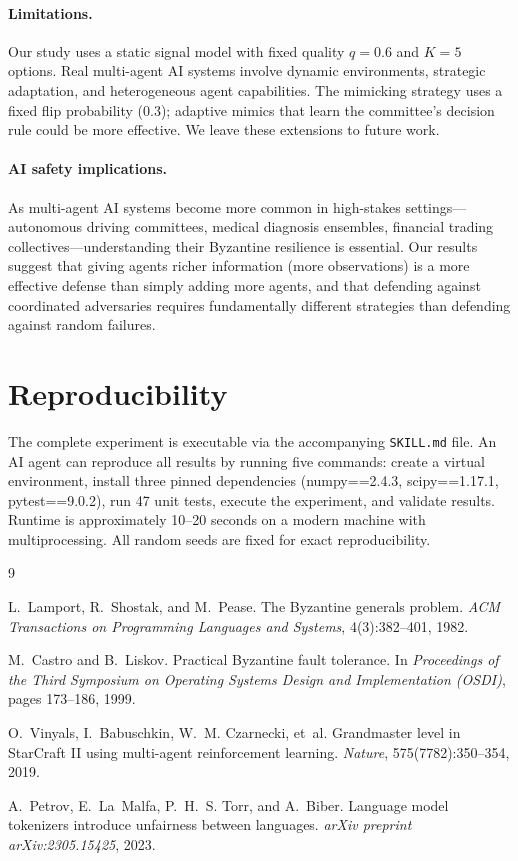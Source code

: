 \documentclass[11pt]{article}
\begin{document}
\paragraph{Limitations.}
Our study uses a static signal model with fixed quality $q = 0.6$ and $K = 5$ options.
Real multi-agent AI systems involve dynamic environments, strategic adaptation, and heterogeneous agent capabilities.
The mimicking strategy uses a fixed flip probability (0.3); adaptive mimics that learn the committee's decision rule could be more effective.
We leave these extensions to future work.

\paragraph{AI safety implications.}
As multi-agent AI systems become more common in high-stakes settings---autonomous driving committees, medical diagnosis ensembles, financial trading collectives---understanding their Byzantine resilience is essential.
Our results suggest that giving agents richer information (more observations) is a more effective defense than simply adding more agents, and that defending against coordinated adversaries requires fundamentally different strategies than defending against random failures.

\section{Reproducibility}

The complete experiment is executable via the accompanying \texttt{SKILL.md} file.
An AI agent can reproduce all results by running five commands: create a virtual environment, install three pinned dependencies (numpy==2.4.3, scipy==1.17.1, pytest==9.0.2), run 47 unit tests, execute the experiment, and validate results.
Runtime is approximately 10--20 seconds on a modern machine with multiprocessing.
All random seeds are fixed for exact reproducibility.


\begin{thebibliography}{9}

L.~Lamport, R.~Shostak, and M.~Pease.
\newblock The {B}yzantine generals problem.
\newblock \emph{ACM Transactions on Programming Languages and Systems}, 4(3):382--401, 1982.

M.~Castro and B.~Liskov.
\newblock Practical {B}yzantine fault tolerance.
\newblock In \emph{Proceedings of the Third Symposium on Operating Systems Design and Implementation (OSDI)}, pages 173--186, 1999.

O.~Vinyals, I.~Babuschkin, W.~M. Czarnecki, et~al.
\newblock Grandmaster level in {S}tar{C}raft {II} using multi-agent reinforcement learning.
\newblock \emph{Nature}, 575(7782):350--354, 2019.

A.~Petrov, E.~La~Malfa, P.~H.~S. Torr, and A.~Biber.
\newblock Language model tokenizers introduce unfairness between languages.
\newblock \emph{arXiv preprint arXiv:2305.15425}, 2023.

\end{thebibliography}
\end{document}
